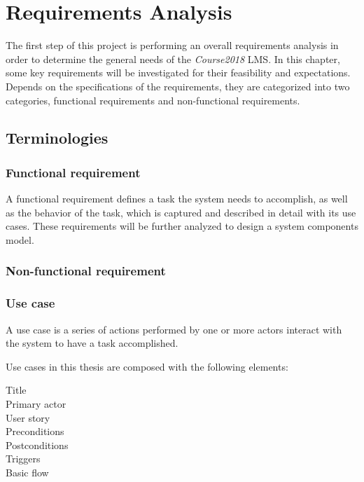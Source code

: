 

\chapter{Requirements Analysis}
\label{chap:REQS}

The first step of this project is performing an overall requirements analysis
in order to determine the general needs of the \emph{Course2018} LMS.
In this chapter, some key requirements will be investigated for their
feasibility and expectations.
Depends on the specifications of the requirements, they are categorized into
two categories, functional requirements and non-functional requirements.

\section{Terminologies}

\subsection{Functional requirement}
A functional requirement defines a task the system needs to accomplish,
as well as the behavior of the task, which is captured and described in detail
with its use cases.
These requirements will be further analyzed to design a system components
model.~\cite{functionalReqs}

\subsection{Non-functional requirement}

\subsection{Use case}
A use case is a series of actions performed by one or more actors interact
with the system to have a task accomplished. \cite{useCase}

\medskip 

Use cases in this thesis are composed with the following elements:
\pagebreak
\begin{description}
    \item[Title]
    \item[Primary actor]
    \item[User story]
    \item[Preconditions]
    \item[Postconditions]
    \item[Triggers]
    \item[Basic flow]
\end{description}

